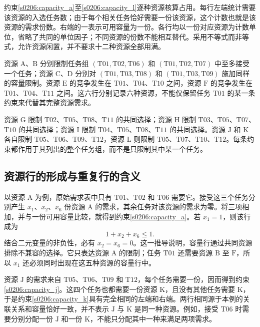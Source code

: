 约束\eqref{s0206:capacity_a}至\eqref{s0206:capacity_l}逐种资源核算占用。每行左端统计需要该资源的入选任务数；由于每个相关任务恰好需要一份该资源，这个计数也就是该资源的需求份数。右端的一表示可用容量为一份。各行均以一份对应资源为计数单位，省略了共同的单位因子；不同资源的份数不能相互替代。采用不等式而非等式，允许资源闲置，并不要求十二种资源全部用满。

资源 $\mathrm{A}$、$\mathrm{B}$ 分别限制任务组 $(\mathrm{T01},\mathrm{T02},\mathrm{T06})$ 和 $(\mathrm{T01},\mathrm{T02},\mathrm{T07})$ 中至多接受一个任务；资源 $\mathrm{C}$、$\mathrm{D}$ 分别对 $(\mathrm{T01},\mathrm{T03},\mathrm{T08})$ 和 $(\mathrm{T01},\mathrm{T03},\mathrm{T09})$ 施加同样的容量限制。资源 $\mathrm{E}$ 的竞争发生在 $\mathrm{T01}$、$\mathrm{T04}$、$\mathrm{T10}$ 之间，资源 $\mathrm{F}$ 的竞争发生在 $\mathrm{T01}$、$\mathrm{T04}$、$\mathrm{T11}$ 之间。这六行分别记录六种资源，不能仅保留任务 $\mathrm{T01}$ 的某一条约束来代替其完整资源需求。

资源 $\mathrm{G}$ 限制 $\mathrm{T02}$、$\mathrm{T05}$、$\mathrm{T08}$、$\mathrm{T11}$ 的共同选择；资源 $\mathrm{H}$ 限制 $\mathrm{T03}$、$\mathrm{T05}$、$\mathrm{T07}$、$\mathrm{T10}$ 的共同选择；资源 $\mathrm{I}$ 限制 $\mathrm{T04}$、$\mathrm{T05}$、$\mathrm{T08}$、$\mathrm{T11}$ 的共同选择。资源 $\mathrm{J}$ 和 $\mathrm{K}$ 各自限制 $\mathrm{T05}$、$\mathrm{T06}$、$\mathrm{T09}$、$\mathrm{T12}$，资源 $\mathrm{L}$ 则限制 $\mathrm{T05}$、$\mathrm{T07}$、$\mathrm{T10}$、$\mathrm{T12}$。每条约束都作用于其列出的整个任务组，而不是只限制其中某一个任务。

\subsection{资源行的形成与重复行的含义}

以资源 $\mathrm{A}$ 为例，原始需求表中只有 $\mathrm{T01}$、$\mathrm{T02}$ 和 $\mathrm{T06}$ 需要它。接受这三个任务分别产生 $x_1$、$x_2$、$x_6$ 份资源 $\mathrm{A}$ 的需求，其余任务对该资源的需求为零。将三项相加，并与一份可用容量比较，就得到约束\eqref{s0206:capacity_a}。若 $x_1=1$，则该行成为
\begin{equation}
 1+x_2+x_6\leq 1.
 \label{s0206:a_implication}
\end{equation}
结合二元变量的非负性，必有 $x_2=x_6=0$。这一推导说明，容量行通过共同资源排除不兼容的选择。它只表达资源 $\mathrm{A}$ 的限制；任务 $\mathrm{T01}$ 还需要资源 $\mathrm{B}$ 至 $\mathrm{F}$，所以 $x_1$ 还必须同时出现在这五种资源的容量行中。

资源 $\mathrm{J}$ 的需求来自 $\mathrm{T05}$、$\mathrm{T06}$、$\mathrm{T09}$ 和 $\mathrm{T12}$，每个任务需要一份，因而得到约束\eqref{s0206:capacity_j}。这四个任务也都需要一份资源 $\mathrm{K}$，且没有其他任务需要 $\mathrm{K}$，于是约束\eqref{s0206:capacity_k}具有完全相同的左端和右端。两行相同源于本例的关联关系和容量恰好一致，并不表示 $\mathrm{J}$ 与 $\mathrm{K}$ 是同一种资源。例如，接受 $\mathrm{T06}$ 时需要分别分配一份 $\mathrm{J}$ 和一份 $\mathrm{K}$，不能只分配其中一种来满足两项需求。

